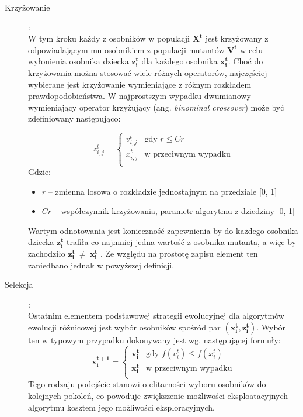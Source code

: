 \documentclass[12pt,a4paper]{report}
\begin{document}
{{{\begin{description}
	  \item[Krzyżowanie]:\\
  W tym kroku każdy z osobników w populacji $\mathbf{X^{t}}$ jest krzyżowany z odpowiadającym mu osobnikiem z populacji mutantów $\mathbf{V^{t}}$ w celu wyłonienia osobnika dziecka $\mathbf{z_i^{t}}$ dla każdego osobnika $\mathbf{x_i^{t}}$. Choć do krzyżowania można stosować wiele różnych operatorów, najczęściej wybierane jest krzyżowanie wymieniające z różnym rozkładem prawdopodobieństwa. W najprostszym wypadku dwumianowy wymieniający operator krzyżujący (ang. \emph{binominal crossover}) może być zdefiniowany następująco:
  
\begin{equation}
\label{eq:BasicCrossover}
z_{i,j}^{t} = \left\{ \begin{array}{ll}
v_{i,j}^{t} & \textrm{gdy $r \le Cr$}\\
x_{i,j}^{t} & \textrm{w przeciwnym wypadku}\\
\end{array} \right.
\end{equation}
Gdzie:
\begin{itemize}
\item $r$ -- zmienna losowa o rozkładzie jednostajnym na przedziale [0, 1]
\item $Cr$ -- współczynnik krzyżowania, parametr algorytmu z dziedziny [0, 1]
\end{itemize}
Wartym odnotowania jest konieczność zapewnienia by do każdego osobnika dziecka $\mathbf{z_i^{t}}$ trafiła co najmniej jedna wartość z osobnika mutanta, a więc by zachodziło $\mathbf{z_i^{t}}~\neq~\mathbf{x_i^{t}}$ \cite{SpringerIntroToEvol}. Ze względu na prostotę zapisu element ten zaniedbano jednak w powyższej definicji.


		\item[Selekcja]:\\
Ostatnim elementem podstawowej strategii ewolucyjnej dla algorytmów ewolucji różnicowej jest wybór osobników spośród par $(\mathbf{x_i^{t}}, \mathbf{z_i^{t}})$. Wybór ten w typowym przypadku dokonywany jest wg. następującej formuły:
\begin{equation}
\mathbf{x_{i}^{t+1}} = \left\{ \begin{array}{ll}
\mathbf{v_{i}^{t}} & \textrm{gdy $f(v_i^t) \le f(x_i^t)$}\\
\mathbf{x_{i}^{t}} & \textrm{w przeciwnym wypadku}\\
\end{array} \right.
\end{equation}
Tego rodzaju podejście stanowi o elitarności wyboru osobników do kolejnych pokoleń, co powoduje zwiększenie możliwości eksploatacyjnych algorytmu kosztem jego możliwości eksploracyjnych.
\end{description}
}

}}
\end{document}
